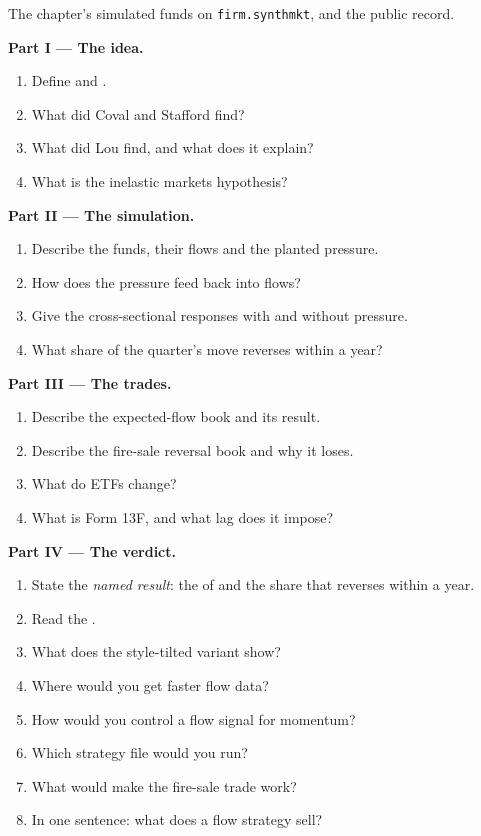 \begin{problem}\label{pb:s1:flows:1}
The chapter's simulated funds on \texttt{firm.synthmkt}, and the public record.

\medskip\noindent\textbf{Part I --- The idea.}
\begin{enumerate}
\item Define  and .
\item What did Coval and Stafford find?
\item What did Lou find, and what does it explain?
\item What is the inelastic markets hypothesis?
\end{enumerate}

\medskip\noindent\textbf{Part II --- The simulation.}
\begin{enumerate}[resume]
\item Describe the funds, their flows and the planted pressure.
\item How does the pressure feed back into flows?
\item Give the cross-sectional responses with and without pressure.
\item What share of the quarter's move reverses within a year?
\end{enumerate}

\medskip\noindent\textbf{Part III --- The trades.}
\begin{enumerate}[resume]
\item Describe the expected-flow book and its result.
\item Describe the fire-sale reversal book and why it loses.
\item What do ETFs change?
\item What is Form 13F, and what lag does it impose?
\end{enumerate}

\medskip\noindent\textbf{Part IV --- The verdict.}
\begin{enumerate}[resume]
\item State the \emph{named result}: the  of  and the share that reverses within a year.
\item Read the .
\item What does the style-tilted variant show?
\item Where would you get faster flow data?
\item How would you control a flow signal for momentum?
\item Which strategy file would you run?
\item What would make the fire-sale trade work?
\item In one sentence: what does a flow strategy sell?
\end{enumerate}
\end{problem}

